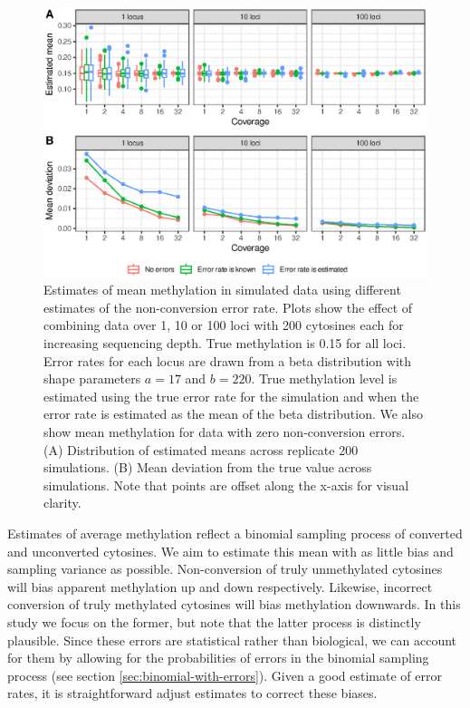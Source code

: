 \documentclass[12pt,longbibliography]{article}
\begin{document}
\begin{figure}
    \includegraphics{figure3.eps}
    \caption{
        Estimates of mean methylation in simulated data using different estimates of the non-conversion error rate.
        Plots show the effect of combining data over 1, 10 or 100 loci with 200 cytosines each for increasing sequencing depth.
        True methylation is 0.15 for all loci.
        Error rates for each locus are drawn from a beta distribution with shape parameters $a=17$ and $b=220$.
        True methylation level is estimated using the true error rate for the simulation and when the error rate is estimated as the mean of the beta distribution.
        We also show mean methylation for data with zero non-conversion errors.
        (A) Distribution of estimated means across replicate 200 simulations.
        (B) Mean deviation from the true value across simulations.
        Note that points are offset along the x-axis for visual clarity.
    }
    \label{fig:simulations}
\end{figure}

Estimates of average methylation reflect a binomial sampling process of converted and unconverted cytosines.
We aim to estimate this mean with as little bias and sampling variance as possible.
Non-conversion of truly unmethylated cytosines will bias apparent methylation up and down respectively.
Likewise, incorrect conversion of truly methylated cytosines will bias methylation downwards.
In this study we focus on the former, but note that the latter process is distinctly plausible.
Since these errors are statistical rather than biological, we can account for them by allowing for the probabilities of errors in the binomial sampling process (see section \ref{sec:binomial-with-errors}).
Given a good estimate of error rates, it is straightforward adjust estimates to correct these biases.
\end{document}
